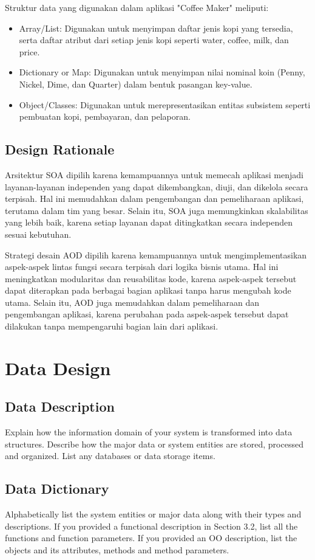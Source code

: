 \documentclass[12pt]{article}
\begin{document}
    

Struktur data yang digunakan dalam aplikasi "Coffee Maker" meliputi:
\begin{itemize}
\item Array/List: Digunakan untuk menyimpan daftar jenis kopi yang tersedia, serta daftar atribut dari setiap jenis kopi seperti water, coffee, milk, dan price.
\item Dictionary or Map: Digunakan untuk menyimpan nilai nominal koin (Penny, Nickel, Dime, dan Quarter) dalam bentuk pasangan key-value.
\item Object/Classes: Digunakan untuk merepresentasikan entitas subsistem seperti pembuatan kopi, pembayaran, dan pelaporan.
\end{itemize}

\subsection{Design Rationale}
Arsitektur SOA dipilih karena kemampuannya untuk memecah aplikasi menjadi layanan-layanan independen yang dapat dikembangkan, diuji, dan dikelola secara terpisah. Hal ini memudahkan dalam pengembangan dan pemeliharaan aplikasi, terutama dalam tim yang besar. Selain itu, SOA juga memungkinkan skalabilitas yang lebih baik, karena setiap layanan dapat ditingkatkan secara independen sesuai kebutuhan.

Strategi desain AOD dipilih karena kemampuannya untuk mengimplementasikan aspek-aspek lintas fungsi secara terpisah dari logika bisnis utama. Hal ini meningkatkan modularitas dan reusabilitas kode, karena aspek-aspek tersebut dapat diterapkan pada berbagai bagian aplikasi tanpa harus mengubah kode utama. Selain itu, AOD juga memudahkan dalam pemeliharaan dan pengembangan aplikasi, karena perubahan pada aspek-aspek tersebut dapat dilakukan tanpa mempengaruhi bagian lain dari aplikasi.


\section{Data Design}
\subsection{Data Description}
Explain how the information domain of your system is transformed into data structures. Describe how the major data or system entities are stored, processed and organized. List any 
databases or data storage items.

\subsection {Data Dictionary}
Alphabetically list the system entities or major data along with their types and descriptions. If
you  provided  a  functional description  in  Section 3.2, list all the  functions and function 
parameters. If you provided an OO description, list the objects and its attributes, methods and 
method parameters.
\end{document}

